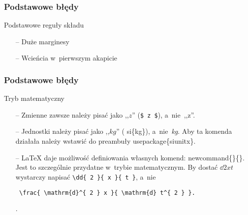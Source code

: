 \documentclass{beamer}  %
\begin{document}
\begin{frame}
  \frametitle{Podstawowe błędy}

  \begin{block}{Podstawowe reguły składu}
    \begin{itemize}
    \item[--] Duże marginesy %
    \item[--] Wcieńcia w~pierwszym akapicie
    \end{itemize}
  \end{block}

\end{frame}



\begin{frame}[fragile]
  \frametitle{Podstawowe błędy}

  \begin{block}{Tryb matematyczny}
    \begin{itemize}
    \item[--] Zmienne zawsze należy pisać jako ,,$z$'' (\texttt{\$ z
        \$}), a~nie~,,z''.
    \item[--] Jednostki należy pisać jako ,,$\si{kg}$'' (\tbs
      si\{kg\}), a~nie~\emph{kg}. Aby ta komenda działała należy
      wstawić do preambuły \tbs usepackage\{siunitx\}.
    \item[--] \LaTeX{} daje możliwość definiowania własnych komend:
      \tbs newcommand\{\}\{\}. Jest to szczególnie przydatne w~trybie
      matematycznym. By dostać $\dd{ 2 }{ x }{ t }$ wystarczy napisać
      \linebreak \verb+\dd{ 2 }{ x }{ t }+, a~nie
\begin{verbatim}
 \frac{ \mathrm{d}^{ 2 } x }{ \mathrm{d} t^{ 2 } }.
\end{verbatim}.
    \end{itemize}
  \end{block}

\end{frame}
\end{document}
